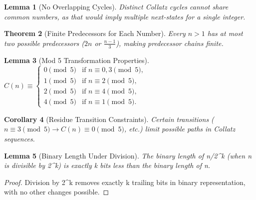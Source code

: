\documentclass[11pt]{article}
\newtheorem{theorem}{Theorem}[section]
\newtheorem{lemma}[theorem]{Lemma}
\newtheorem{corollary}[theorem]{Corollary}
\begin{document}
\begin{lemma}[No Overlapping Cycles]
Distinct Collatz cycles cannot share common numbers, as that would imply multiple next-states for a single integer.
\end{lemma}

\begin{theorem}[Finite Predecessors for Each Number]
Every \( n>1 \) has at most two possible predecessors (\(2n\) or \(\tfrac{n-1}{3}\)), making predecessor chains finite.
\end{theorem}

\begin{lemma}[Mod 5 Transformation Properties]
\(
C(n) \equiv
\begin{cases}
0 \pmod{5} & \text{if } n \equiv 0,3 \pmod{5},\\
1 \pmod{5} & \text{if } n \equiv 2 \pmod{5},\\
2 \pmod{5} & \text{if } n \equiv 4 \pmod{5},\\
4 \pmod{5} & \text{if } n \equiv 1 \pmod{5}.
\end{cases}
\)

\end{lemma}

\begin{corollary}[Residue Transition Constraints]
Certain transitions (\(n\equiv3\pmod{5} \to C(n)\equiv0\pmod{5}\), etc.) limit possible paths in Collatz sequences.
\end{corollary}

\begin{lemma}[Binary Length Under Division]
The binary length of n/2^k (when n is divisible by 2^k) is exactly k bits less than the binary length of n.
\end{lemma}

\begin{proof}
Division by 2^k removes exactly k trailing bits in binary representation, with no other changes possible.
\end{proof}
\end{document}
